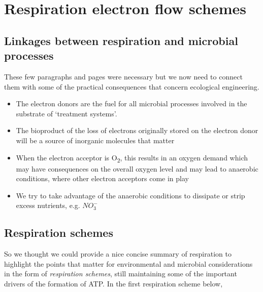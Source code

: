 \documentclass[]{book}
\providecommand{\tightlist}{%
  \setlength{\itemsep}{0pt}\setlength{\parskip}{0pt}}
\theoremstyle{definition}
\theoremstyle{definition}
\theoremstyle{definition}
\theoremstyle{remark}
\begin{document}
\section{Respiration electron flow
schemes}\label{respiration-electron-flow-schemes}

\subsection{Linkages between respiration and microbial
processes}\label{linkages-between-respiration-and-microbial-processes}

These few paragraphs and pages were necessary but we now need to connect
them with some of the practical consequences that concern ecological
engineering.

\begin{itemize}
\tightlist
\item
  The electron donors are the fuel for all microbial processes involved
  in the substrate of `treatment systems'.
\item
  The bioproduct of the loss of electrons originally stored on the
  electron donor will be a source of inorganic molecules that matter
\item
  When the electron acceptor is O\textsubscript{2}, this results in an
  oxygen demand which may have consequences on the overall oxygen level
  and may lead to anaerobic conditions, where other electron acceptors
  come in play
\item
  We try to take advantage of the anaerobic conditions to dissipate or
  strip excess nutrients, e.g. \(NO_3^-\)
\end{itemize}

\subsection{Respiration schemes}\label{respiration-schemes}

So we thought we could provide a nice concise summary of respiration to
highlight the points that matter for environmental and microbial
considerations in the form of \emph{respiration schemes}, still
maintaining some of the important drivers of the formation of ATP. In
the first respiration scheme below,
\end{document}
